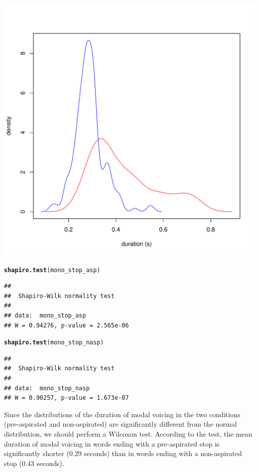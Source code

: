 \documentclass[a4paper,11pt]{article}\usepackage[]{graphicx}\usepackage[]{color}
\makeatletter
\def\maxwidth{ %
  \ifdim\Gin@nat@width>\linewidth
    \linewidth
  \else
    \Gin@nat@width
  \fi
}
\newcommand{\hlstd}[1]{\textcolor[rgb]{0.345,0.345,0.345}{#1}}%
\newcommand{\hlkwd}[1]{\textcolor[rgb]{0.737,0.353,0.396}{\textbf{#1}}}%
\newenvironment{kframe}{%
 \def\at@end@of@kframe{}%
 \ifinner\ifhmode%
  \def\at@end@of@kframe{\end{minipage}}%
  \begin{minipage}{\columnwidth}%
 \fi\fi%
 \def\FrameCommand##1{\hskip\@totalleftmargin \hskip-\fboxsep
 \colorbox{shadecolor}{##1}\hskip-\fboxsep
     \hskip-\linewidth \hskip-\@totalleftmargin \hskip\columnwidth}%
 \MakeFramed {\advance\hsize-\width
   \@totalleftmargin\z@ \linewidth\hsize
   \@setminipage}}%
 {\par\unskip\endMakeFramed%
 \at@end@of@kframe}
\newenvironment{knitrout}{}{} %
\makeatother
\begin{document}
\begin{knitrout}
{\centering \includegraphics[width=\maxwidth]{img/mono-stop-dens-1} 

}



\end{knitrout}

\begin{knitrout}
\color{fgcolor}\begin{kframe}
\begin{alltt}
\hlkwd{shapiro.test}\hlstd{(mono_stop_asp)}
\end{alltt}
\begin{verbatim}
## 
## 	Shapiro-Wilk normality test
## 
## data:  mono_stop_asp
## W = 0.94276, p-value = 2.565e-06
\end{verbatim}
\begin{alltt}
\hlkwd{shapiro.test}\hlstd{(mono_stop_nasp)}
\end{alltt}
\begin{verbatim}
## 
## 	Shapiro-Wilk normality test
## 
## data:  mono_stop_nasp
## W = 0.90257, p-value = 1.673e-07
\end{verbatim}
\end{kframe}
\end{knitrout}

Since the distributions of the duration of modal voicing in the two conditions (pre-aspirated and non-aspirated) are significantly different from the normal distribution, we should perform a Wilcoxon test.
According to the test, the mean duration of modal voicing in words ending with a pre-aspirated stop is significantly shorter (0.29 seconds) than in words ending with a non-aspirated stop (0.43 seconds).
\end{document}
